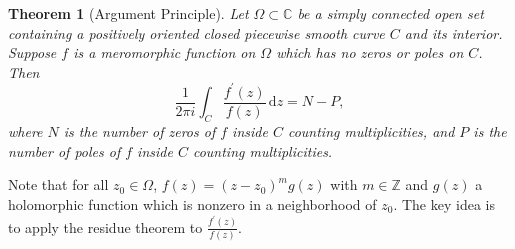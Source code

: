 \documentclass{article}
\newtheorem{theorem}{Theorem}[section]
\theoremstyle{definition}
\newcommand{\C}{\mathbb{C}}
\newcommand{\Z}{\mathbb{Z}}
\newcommand{\dd}{\mathrm{d}}
\begin{document}
\begin{theorem}[Argument Principle]
Let \(\Omega\subset\C\) be a simply connected open set containing a positively oriented closed
piecewise smooth curve \(C\) and its interior. Suppose \(f\) is a meromorphic function on \(\Omega\) which has no zeros or poles on \(C\). Then
\begin{equation*}
    \frac{1}{2\pi i} \int_C \frac{f^{\prime}(z)}{f(z)}\, \dd z = N - P,
\end{equation*}
where \(N\) is the number of zeros of \(f\) inside \(C\) counting multiplicities, and \(P\) is the number of poles of \(f\) inside \(C\) counting multiplicities.
\end{theorem}
Note that for all $z_0\in\Omega$, $f(z)=(z-z_0)^m g(z)$ with $m\in \Z$ and $g(z)$ a holomorphic function which is nonzero in a neighborhood of $z_0$. The key idea is to apply the residue theorem to $\frac{f^{\prime}(z)}{f(z)}$.
\end{document}
